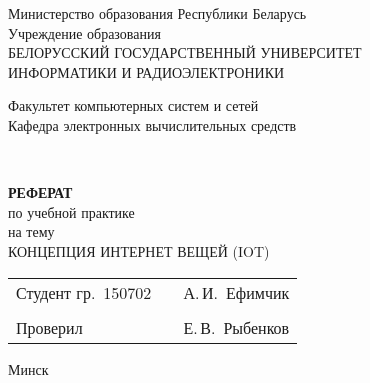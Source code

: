 \begin{titlepage}
    \begin{center}
      Министерство образования Республики Беларусь\\[1em]
      Учреждение образования\\
      БЕЛОРУССКИЙ ГОСУДАРСТВЕННЫЙ УНИВЕРСИТЕТ\\
      ИНФОРМАТИКИ И РАДИОЭЛЕКТРОНИКИ\\[2em]
  
      \begin{minipage}{\textwidth}
        \begin{flushleft}
          Факультет компьютерных систем и сетей\\[1em]
          Кафедра электронных вычислительных средств\\[1em]
        \end{flushleft}
      \end{minipage}\\[1em]
      
      \vfill

      {\bfseries РЕФЕРАТ}\\
      {по учебной практике}\\
      {на тему}\\[1em]
      \MakeUppercase{Концепция Интернет вещей (IoT)}\\[1em]

      \vfill

      \begin{tabular}{p{}p{}p{}}
        Студент гр.~150702     &&   А.\,И.~Ефимчик     \\
                               &&                     \\
        Проверил               &&   Е.\,В.~Рыбенков   \\
      \end{tabular}
      
      \vfill

      {\normalsize Минск \the\year}
    \end{center}
\end{titlepage}
